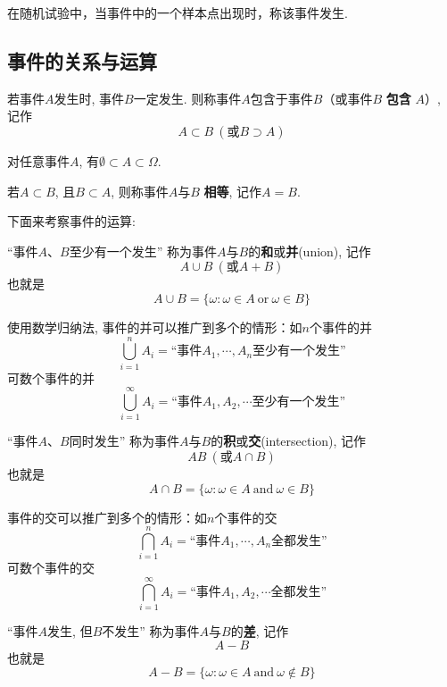在随机试验中，当事件中的一个样本点出现时，称该事件发生.

\subsection{事件的关系与运算}

\begin{definition}[事件的关系]
    若事件$A$发生时, 事件$B$一定发生. 则称事件$A$包含于事件$B$（或事件$B$ \textbf{包含} $A$）, 记作
    $$A\subset B \ (\text{或}B\supset A)$$

    对任意事件$A$, 有$\emptyset \subset A\subset \Omega$.

    若$A\subset B$, 且$B\subset A$, 则称事件$A$与$B$ \textbf{相等}, 记作$A=B$.

\end{definition}

下面来考察事件的运算:

\begin{definition}[事件的并]

    “事件$A$、$B$至少有一个发生”
    称为事件$A$与$B$的\textbf{和}或\textbf{并}(union), 记作
    $$A\cup B \ (\text{或}A+B)$$
    也就是
    $$A\cup B=\{\omega : \omega\in A \ \text{or}\ \omega\in B\}$$
\end{definition}

\begin{remark}
    使用数学归纳法, 事件的并可以推广到多个的情形：如$n$个事件的并
    $$\bigcup_{i=1}^{n} A_i =\text{“事件$A_1, \cdots, A_n$至少有一个发生”}$$
    可数个事件的并
    $$\bigcup_{i=1}^{\infty} A_i =\text{“事件$A_1, A_2, \cdots$至少有一个发生”}$$
\end{remark}

\begin{definition}
    “事件$A$、$B$同时发生”
    称为事件$A$与$B$的\textbf{积}或\textbf{交}(intersection), 记作
    $$AB \ (\text{或}A\cap B)$$
    也就是$$A\cap B=\{\omega : \omega\in A \ \text{and}\ \omega\in B\}$$
\end{definition}

\begin{remark}
    事件的交可以推广到多个的情形：如$n$个事件的交
    $$\bigcap_{i=1}^{n} A_i =\text{“事件$A_1, \cdots, A_n$全都发生”}$$
    可数个事件的交
    $$\bigcap_{i=1}^{\infty} A_i =\text{“事件$A_1, A_2, \cdots$全都发生”}$$
\end{remark}

\begin{definition}
    “事件$A$发生, 但$B$不发生”
    称为事件$A$与$B$的\textbf{差}, 记作
    $$A-B$$
    也就是
    $$A- B=\{\omega : \omega\in A \ \text{and}\ \omega\notin B\}$$
\end{definition}

